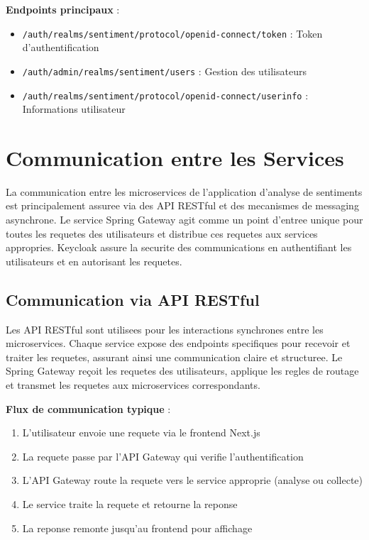 \textbf{Endpoints principaux} :
\begin{itemize}
    \item \texttt{/auth/realms/sentiment/protocol/openid-connect/token} : Token d'authentification
    \item \texttt{/auth/admin/realms/sentiment/users} : Gestion des utilisateurs
    \item \texttt{/auth/realms/sentiment/protocol/openid-connect/userinfo} : Informations utilisateur
\end{itemize}

\section{Communication entre les Services}

La communication entre les microservices de l'application d'analyse de sentiments est principalement assuree via des API RESTful et des mecanismes de messaging asynchrone. Le service Spring Gateway agit comme un point d'entree unique pour toutes les requetes des utilisateurs et distribue ces requetes aux services appropries. Keycloak assure la securite des communications en authentifiant les utilisateurs et en autorisant les requetes.

\subsection{Communication via API RESTful}

Les API RESTful sont utilisees pour les interactions synchrones entre les microservices. Chaque service expose des endpoints specifiques pour recevoir et traiter les requetes, assurant ainsi une communication claire et structuree. Le Spring Gateway reçoit les requetes des utilisateurs, applique les regles de routage et transmet les requetes aux microservices correspondants.

\textbf{Flux de communication typique} :
\begin{enumerate}
    \item L'utilisateur envoie une requete via le frontend Next.js
    \item La requete passe par l'API Gateway qui verifie l'authentification
    \item L'API Gateway route la requete vers le service approprie (analyse ou collecte)
    \item Le service traite la requete et retourne la reponse
    \item La reponse remonte jusqu'au frontend pour affichage
\end{enumerate}

